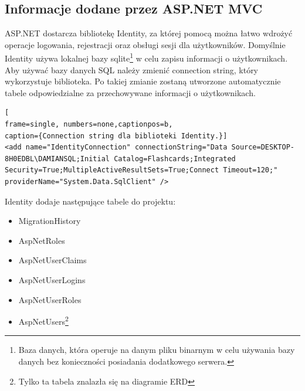 
\subsection{Informacje dodane przez ASP.NET MVC}

ASP.NET dostarcza bibliotekę Identity, za której pomocą można łatwo wdrożyć operacje logowania, rejestracji oraz obsługi sesji dla użytkowników. Domyślnie Identity używa lokalnej bazy sqlite\footnote{Baza danych, która operuje na danym pliku binarnym w celu używania bazy danych bez konieczności posiadania dodatkowego serwera.} w celu zapisu informacji o użytkownikach. Aby używać bazy danych SQL należy zmienić connection string, który wykorzystuje biblioteka. Po takiej zmianie zostaną utworzone automatycznie tabele odpowiedzialne za przechowywane informacji o użytkownikach.

\begin{minipage}{\linewidth}
\begin{lstlisting}[
frame=single, numbers=none,captionpos=b, 
caption={Connection string dla biblioteki Identity.}]
<add name="IdentityConnection" connectionString="Data Source=DESKTOP-8H0EDBL\DAMIANSQL;Initial Catalog=Flashcards;Integrated Security=True;MultipleActiveResultSets=True;Connect Timeout=120;" providerName="System.Data.SqlClient" />

\end{lstlisting}
\end{minipage}

Identity dodaje następujące tabele do projektu:
\begin{itemize}
	\item \textunderscore\textunderscore MigrationHistory
	\item AspNetRoles
	\item AspNetUserClaims
	\item AspNetUserLogins
	\item AspNetUserRoles
	\item AspNetUsers\footnote{Tylko ta tabela znalazła się na diagramie ERD}
\end{itemize}

